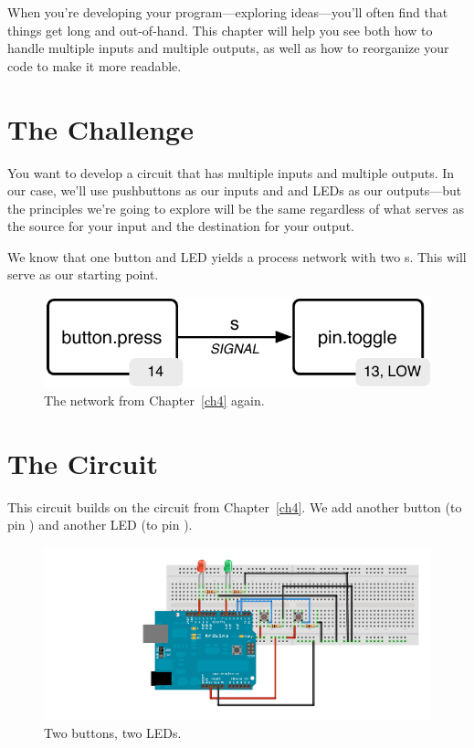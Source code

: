 When you're developing your program---exploring ideas---you'll often find that things get long and out-of-hand. This chapter will help you see both how to handle multiple inputs and multiple outputs, as well as how to reorganize your code to make it more readable.

\section{The Challenge}

You want to develop a circuit that has multiple inputs and multiple outputs. In our case, we'll use pushbuttons as our inputs and and LEDs as our outputs---but the principles we're going to explore will be the same regardless of what serves as the source for your input and the destination for your output.

We know that one button and LED yields a process network with two {\PROCedure}s. This will serve as our starting point.

\vspace{3mm}
\begin{figure}[ht]
  \begin{center}
    \includegraphics[width=0.8\linewidth]{images/ch4-button-toggle-led}
    \caption{The network from Chapter~\ref{ch4} again.}
    \label{diagram:ch6-button-toggle-led}
  \end{center}
\end{figure}


\section{The Circuit}

This circuit builds on the circuit from Chapter~\ref{ch4}. We add another button (to pin {}) and another LED (to pin {}).

\begin{figure}[ht]
  \begin{center}
    \includegraphics[width=0.8\linewidth]{images/ch6-two-button-circuit}
    \caption{Two buttons, two LEDs.}
    \label{diagram:ch6-two-button-circuit}
  \end{center}
\end{figure}

